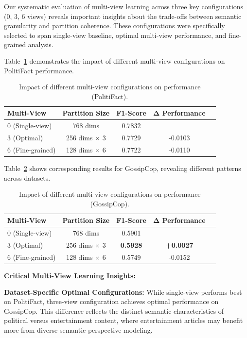 Our systematic evaluation of multi-view learning across three key configurations (0, 3, 6 views) reveals important insights about the trade-offs between semantic granularity and partition coherence. These configurations were specifically selected to span single-view baseline, optimal multi-view performance, and fine-grained analysis.

Table~\ref{tab:hyperparameter_multi_view_politifact} demonstrates the impact of different multi-view configurations on PolitiFact performance.

\begin{table}[htbp]
\centering
\caption{Impact of different multi-view configurations on performance (PolitiFact).}
\label{tab:hyperparameter_multi_view_politifact}
\begin{tabular}{lcccc}
\toprule
\textbf{Multi-View} & \textbf{Partition Size} & \textbf{F1-Score} & \textbf{Δ Performance} \\
\midrule
0 (Single-view) & 768 dims & 0.7832 & \- \\
3 (Optimal) & 256 dims × 3 & 0.7729 & -0.0103 \\
6 (Fine-grained) & 128 dims × 6 & 0.7722 & -0.0110 \\
\bottomrule
\end{tabular}
\end{table}

Table~\ref{tab:hyperparameter_multi_view_gossipcop} shows corresponding results for GossipCop, revealing different patterns across datasets.

\begin{table}[htbp]
\centering
\caption{Impact of different multi-view configurations on performance (GossipCop).}
\label{tab:hyperparameter_multi_view_gossipcop}
\begin{tabular}{lcccc}
\toprule
\textbf{Multi-View} & \textbf{Partition Size} & \textbf{F1-Score} & \textbf{Δ Performance} \\
\midrule
0 (Single-view) & 768 dims & 0.5901 & \- \\
3 (Optimal) & 256 dims × 3 & \textbf{0.5928} & \textbf{+0.0027} \\
6 (Fine-grained) & 128 dims × 6 & 0.5749 & -0.0152 \\
\bottomrule
\end{tabular}
\end{table}

\textbf{Critical Multi-View Learning Insights:}

\textbf{Dataset-Specific Optimal Configurations:} While single-view performs best on PolitiFact, three-view configuration achieves optimal performance on GossipCop. This difference reflects the distinct semantic characteristics of political versus entertainment content, where entertainment articles may benefit more from diverse semantic perspective modeling.

